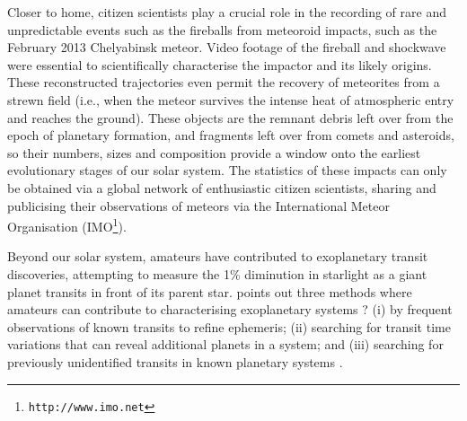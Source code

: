 \documentclass{ar2e}
\begin{document}
 Closer to home, citizen scientists play a crucial role in the
recording of rare and unpredictable events such as the fireballs from meteoroid
impacts, such as the February 2013 Chelyabinsk meteor.  Video footage of the
fireball and shockwave were essential to scientifically characterise the
impactor and its likely origins.   These reconstructed trajectories even permit the recovery of meteorites
from a strewn field (i.e., when the meteor survives the intense heat of
atmospheric entry and reaches the ground).  These objects are the remnant debris
left over from the epoch of planetary formation, and fragments left over from
comets and asteroids, so their numbers, sizes and composition provide a window
onto the earliest evolutionary stages of our solar system.  The statistics of
these impacts can only be obtained via a global network of enthusiastic citizen
scientists, sharing and publicising their observations of meteors via the
International Meteor Organisation (IMO\footnote{\texttt{http://www.imo.net}}).



% 


 Beyond our solar system, amateurs have
contributed to exoplanetary transit discoveries,  attempting to measure the 1\%
diminution in starlight as a giant planet transits in front of its parent star.
\citet{13mousis} points out three methods where amateurs can contribute to
characterising exoplanetary systems ? (i) by frequent observations of known
transits to refine ephemeris; (ii) searching for transit time variations that
can reveal additional planets in a system; and (iii) searching for previously
unidentified transits in known planetary systems \citep[e.g., the discovery of
the transit of HD 80606b from a 30 cm telescope near London,][]{09fossey}.
\end{document}
